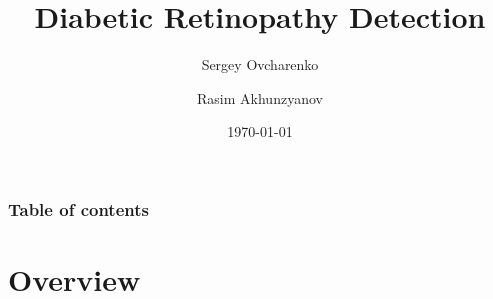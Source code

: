 \documentclass{beamer}
\begin{document}
\title{Diabetic Retinopathy Detection}
\subtitle{}  
\author[]{Sergey Ovcharenko  \and Rasim Akhunzyanov }

\date{\today} 

\begin{frame}
\titlepage
\end{frame}

\begin{frame}
\frametitle{Table of contents}\tableofcontents
\end{frame} 


\section{Overview} 
\end{document}
